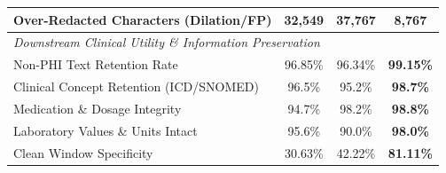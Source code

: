 \begin{table}[t]
\begin{tabular}{l ccc}
Over-Redacted Characters (Dilation/FP) & 32,549 & 37,767 & \textbf{8,767} \\
\midrule
\multicolumn{4}{l}{\textit{Downstream Clinical Utility \& Information Preservation}} \\[2pt]
Non-PHI Text Retention Rate & 96.85\% & 96.34\% & \textbf{99.15\%} \\
Clinical Concept Retention (ICD/SNOMED) & 96.5\% & 95.2\% & \textbf{98.7\%} \\
Medication \& Dosage Integrity & 94.7\% & 98.2\% & \textbf{98.8\%} \\
Laboratory Values \& Units Intact & 95.6\% & 90.0\% & \textbf{98.0\%} \\
Clean Window Specificity & 30.63\% & 42.22\% & \textbf{81.11\%} \\
\bottomrule
\end{tabular}
\end{table}